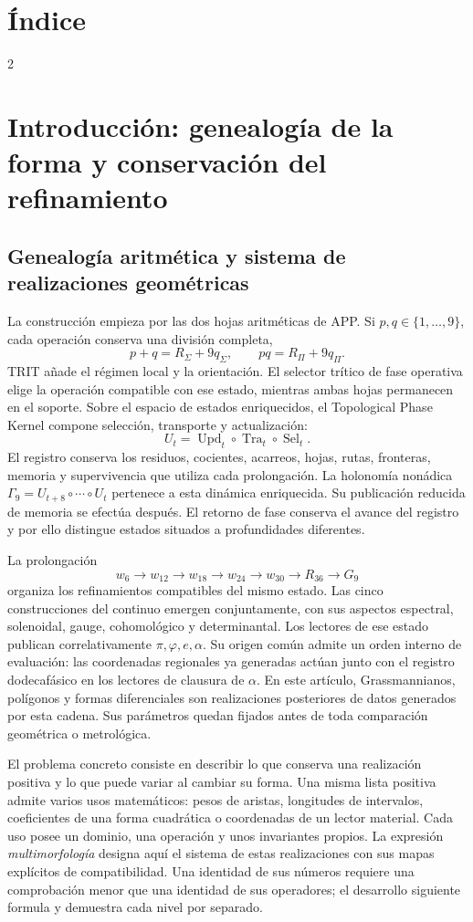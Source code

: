 \documentclass[a4paper,10pt]{article}
\makeatletter
\theoremstyle{definition}\newtheorem{definition}[theorem]{Definición}
\theoremstyle{remark}\newtheorem{remark}[theorem]{Observación}
\numberwithin{equation}{section}
\newcommand{\compactcontents}{%
  \begingroup
  \fontsize{9.2}{11.1}\selectfont
  \setlength{\parskip}{0pt}\setlength{\columnsep}{7mm}
  \renewcommand{\l@section}{\@dottedtocline{1}{0pt}{1.8em}}
  \renewcommand{\l@part}[2]{\addpenalty{-\@highpenalty}\addvspace{6pt}%
    {\bfseries\noindent ##1\nobreak\hfill\nobreak ##2\par}\nobreak}
  \section*{Índice}
  \begin{multicols}{2}\@starttoc{toc}\end{multicols}
  \endgroup}
\makeatother
\begin{document}
\clearpage
\compactcontents
\clearpage

\section{Introducción: genealogía de la forma y conservación del refinamiento}
\label{sec:genealogy}

\subsection{Genealogía aritmética y sistema de realizaciones geométricas}
La construcción empieza por las dos hojas aritméticas de APP. Si
\(p,q\in\{1,\ldots,9\}\), cada operación conserva una división completa,
\[
 p+q=R_\Sigma+9q_\Sigma,\qquad
 pq=R_\Pi+9q_\Pi.
\]
TRIT añade el régimen local y la orientación. El selector trítico de fase
operativa elige la operación compatible con ese estado, mientras ambas hojas
permanecen en el soporte. Sobre el espacio de estados enriquecidos, el
Topological Phase Kernel compone selección, transporte y actualización:
\[
 U_t=\operatorname{Upd}_t\circ\operatorname{Tra}_t\circ\operatorname{Sel}_t.
\]
El registro conserva los residuos, cocientes, acarreos, hojas, rutas,
fronteras, memoria y supervivencia que utiliza cada prolongación. La
holonomía nonádica \(\Gamma_9=U_{t+8}\circ\cdots\circ U_t\) pertenece
a esta dinámica enriquecida. Su publicación reducida de memoria se efectúa
después. El retorno de fase conserva el avance del registro y por ello
distingue estados situados a profundidades diferentes.

La prolongación
\[
 w_6\longrightarrow w_{12}\longrightarrow w_{18}\longrightarrow
 w_{24}\longrightarrow w_{30}\longrightarrow R_{36}\longrightarrow G_9
\]
organiza los refinamientos compatibles del mismo estado. Las cinco
construcciones del continuo emergen conjuntamente, con sus aspectos
espectral, solenoidal, gauge, cohomológico y determinantal. Los lectores
de ese estado publican correlativamente \(\pi,\varphi,e,\alpha\).
Su origen común admite un orden interno de evaluación: las coordenadas
regionales ya generadas actúan junto con el registro dodecafásico en los
lectores de clausura de \(\alpha\). En este artículo, Grassmannianos,
polígonos y formas diferenciales son realizaciones posteriores de datos
generados por esta cadena. Sus parámetros quedan fijados antes de toda
comparación geométrica o metrológica.

El problema concreto consiste en describir lo que conserva una realización
positiva y lo que puede variar al cambiar su forma. Una misma lista positiva
admite varios usos matemáticos: pesos de aristas, longitudes de intervalos,
coeficientes de una forma cuadrática o coordenadas de un lector material.
Cada uso posee un dominio, una operación y unos invariantes propios. La
expresión \emph{multimorfología} designa aquí el sistema de estas realizaciones
con sus mapas explícitos de compatibilidad. Una identidad de sus números
requiere una comprobación menor que una identidad de sus operadores; el
desarrollo siguiente formula y demuestra cada nivel por separado.
\end{document}
